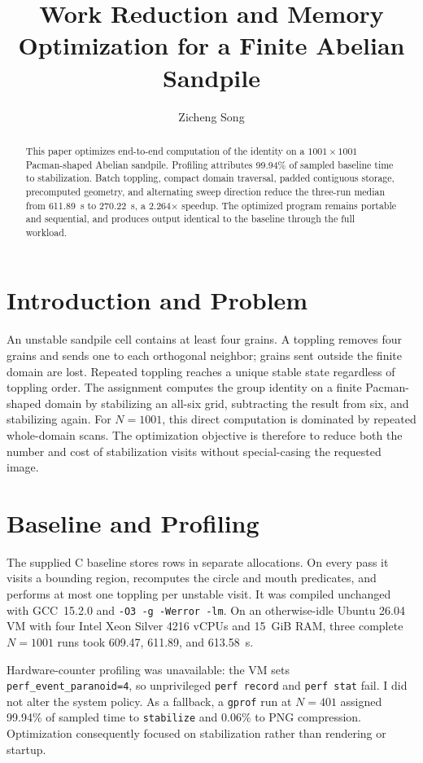 \documentclass[sigplan,screen,nonacm]{acmart}
\title{Work Reduction and Memory Optimization for a Finite Abelian Sandpile}
\author{Zicheng Song}
\affiliation{%
  \institution{University of Illinois Urbana-Champaign}
  \department{CS 598 Advanced Performance Engineering}
  \city{Urbana}
  \country{USA}}
\begin{document}
\begin{abstract}
This paper optimizes end-to-end computation of the identity on a
$1001\times1001$ Pacman-shaped Abelian sandpile. Profiling attributes 99.94\%
of sampled baseline time to stabilization. Batch toppling, compact domain
traversal, padded contiguous storage, precomputed geometry, and alternating
sweep direction reduce the three-run median from 611.89~s to 270.22~s, a
2.264$\times$ speedup. The optimized program remains portable and sequential,
and produces output identical to the baseline through the full workload.
\end{abstract}
\maketitle
{}

\section{Introduction and Problem}
An unstable sandpile cell contains at least four grains. A toppling removes
four grains and sends one to each orthogonal neighbor; grains sent outside the
finite domain are lost. Repeated toppling reaches a unique stable state
regardless of toppling order. The assignment computes the group identity on a
finite Pacman-shaped domain by stabilizing an all-six grid, subtracting the
result from six, and stabilizing again. For $N=1001$, this direct computation
is dominated by repeated whole-domain scans. The optimization objective is
therefore to reduce both the number and cost of stabilization visits without
special-casing the requested image.

\section{Baseline and Profiling}
The supplied C baseline stores rows in separate allocations. On every pass it
visits a bounding region, recomputes the circle and mouth predicates, and
performs at most one toppling per unstable visit. It was compiled unchanged
with GCC~15.2.0 and \texttt{-O3 -g -Werror -lm}. On an otherwise-idle Ubuntu
26.04 VM with four Intel Xeon Silver 4216 vCPUs and 15~GiB RAM, three complete
$N=1001$ runs took 609.47, 611.89, and 613.58~s.

Hardware-counter profiling was unavailable: the VM sets
\texttt{perf\_event\_paranoid=4}, so unprivileged \texttt{perf record} and
\texttt{perf stat} fail. I did not alter the system policy. As a fallback, a
\texttt{gprof} run at $N=401$ assigned 99.94\% of sampled time to
\texttt{stabilize} and 0.06\% to PNG compression. Optimization consequently
focused on stabilization rather than rendering or startup.
\end{document}
